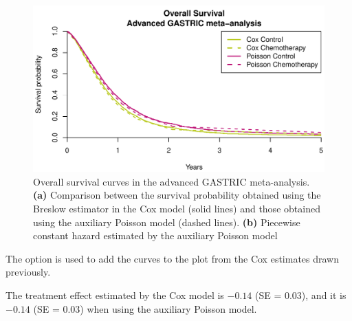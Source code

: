 \documentclass[]{scrartcl}\usepackage[]{graphicx}\usepackage[]{color}
\makeatletter
\def\maxwidth{ %
  \ifdim\Gin@nat@width>\linewidth
    \linewidth
  \else
    \Gin@nat@width
  \fi
}
\newenvironment{kframe}{%
 \def\at@end@of@kframe{}%
 \ifinner\ifhmode%
  \def\at@end@of@kframe{\end{minipage}}%
  \begin{minipage}{\columnwidth}%
 \fi\fi%
 \def\FrameCommand##1{\hskip\@totalleftmargin \hskip-\fboxsep
 \colorbox{shadecolor}{##1}\hskip-\fboxsep
     \hskip-\linewidth \hskip-\@totalleftmargin \hskip\columnwidth}%
 \MakeFramed {\advance\hsize-\width
   \@totalleftmargin\z@ \linewidth\hsize
   \@setminipage}}%
 {\par\unskip\endMakeFramed%
 \at@end@of@kframe}
\newenvironment{knitrout}{}{} %
\makeatother
\begin{document}
{{\begin{knitrout}
\begin{kframe}
\begin{alltt}
\end{alltt}
\end{kframe}\begin{figure}
\includegraphics[width=\maxwidth]{figs/figpoissonize-1} \caption{Overall survival curves in the advanced GASTRIC meta-analysis. \textbf{(a)} Comparison between the survival probability obtained using the Breslow estimator in the Cox model (solid lines) and those obtained using the auxiliary Poisson model (dashed lines). \textbf{(b)} Piecewise constant hazard estimated by the auxiliary Poisson model}\label{fig:poissonize}
\end{figure}


\end{knitrout}
The option  is used to add the curves to the plot
  from the Cox estimates drawn previously.

The treatment effect estimated by the Cox model is
  \ensuremath{-0.14} (SE = 
  0.03), 
  and it is \ensuremath{-0.14} (SE = 
  0.03)
  when using the auxiliary Poisson model.
\end{document}
